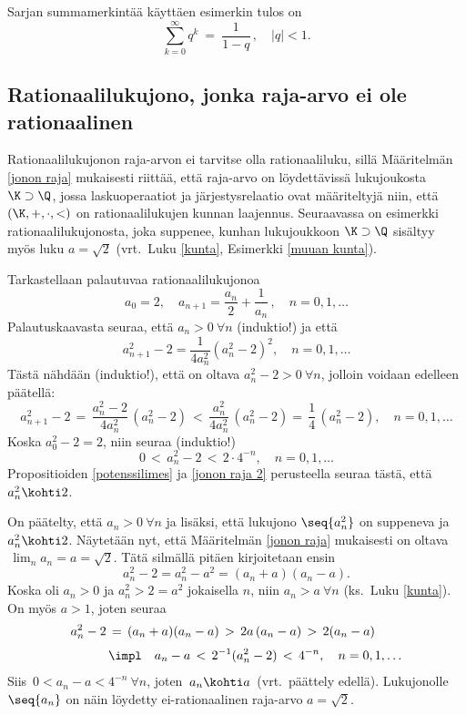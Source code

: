 Sarjan summamerkintää käyttäen esimerkin tulos on
\[
\boxed{\quad \sum_{k=0}^{\infty} q^k\ =\ \frac{1}{1-q}\,, \quad |q|<1. \quad}
\]

\subsection*{Rationaalilukujono, jonka raja-arvo ei ole rationaalinen}

Rationaalilukujonon raja-arvon ei tarvitse olla rationaaliluku, sillä Määritelmän
\ref{jonon raja} mukaisesti riittää, että raja-arvo on löydettävissä lukujoukosta
$\K\supset\Q$, jossa laskuoperaatiot ja järjestysrelaatio ovat määriteltyjä niin,
että $(\K,+,\cdot,<)$ on rationaalilukujen kunnan laajennus. Seuraavassa on esimerkki 
rationaalilukujonosta, joka suppenee, kunhan lukujoukkoon $\K\supset\Q$ sisältyy 
myös luku $a=\sqrt{2}$ (vrt.\ Luku \ref{kunta}, Esimerkki \ref{muuan kunta}).
\begin{Exa} \label{sqrt 2} Tarkastellaan palautuvaa rationaalilukujonoa
\[
a_0 = 2, \quad a_{n+1} = \frac{a_n}{2} + \frac{1}{a_n}\,, \quad n = 0,1,\ldots
\]
Palautuskaavasta seuraa, että $a_n>0\ \forall n$ (induktio!) ja että
\[
a_{n+1}^2 -2 = \frac{1}{4 a_n^2}\left(a_n^2 - 2\right)^2, \quad n = 0,1,\ldots
\]
Tästä nähdään (induktio!), että on oltava $a_n^2-2>0\ \forall n$, jolloin voidaan edelleen 
päätellä:
\[
a_{n+1}^2-2\,=\,\frac{a_n^2-2}{4 a_n^2}\,(a_n^2-2)\,
             <\,\frac{a_n^2}{4a_n^2}\,(a_n^2-2)
             =\,\frac{1}{4}\,(a_n^2-2), \quad n=0,1, \ldots
\]
Koska $a_0^2-2 = 2$, niin seuraa (induktio!)
\[
0\,<\,a_n^2-2\,<\,2\cdot 4^{-n}, \quad n=0,1, \ldots
\]
Propositioiden \ref{potenssilimes} ja \ref{jonon raja 2} perusteella seuraa tästä, että
$a_n^2 \kohti 2$.

On päätelty, että $a_n>0\ \forall n$ ja lisäksi, että lukujono $\seq{a_n^2}$ on suppeneva ja
$a_n^2 \kohti 2$. Näytetään nyt, että Määritelmän \ref{jonon raja} mukaisesti on oltava 
$\,\lim_n a_n=a=\sqrt{2}$. Tätä silmällä pitäen kirjoitetaan ensin
\[
a_n^2 - 2 = a_n^2 - a^2 = (a_n + a)(a_n - a).
\]
Koska oli $a_n>0$ ja $a_n^2>2=a^2$ jokaisella $n$, niin $a_n>a\ \forall n$ 
(ks.\ Luku \ref{kunta}). On myös $a>1$, joten seuraa
\begin{align*}
a_n^2-2\,&=\,(a_n+a)(a_n-a)\,>\,2a\,(a_n-a)\,>\,2(a_n-a) \\[1mm]
         &\impl\quad a_n-a\,<\,2^{-1}(a_n^2-2)\,<\,4^{-n}, \quad n=0,1, \ldots
\end{align*}
Siis $\,0<a_n-a<4^{-n}\ \forall n$, joten $\,a_n \kohti a\,$ (vrt.\ päättely edellä).
Lukujonolle $\seq{a_n}$ on näin löydetty ei-rationaalinen raja-arvo $a=\sqrt{2}$. \loppu
\end{Exa}

